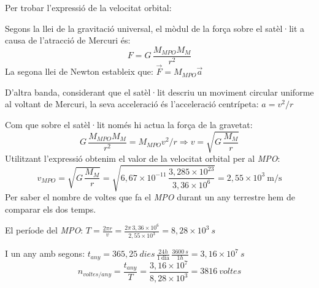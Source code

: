 \begin{solapartat}
Per trobar l'expressió de la velocitat orbital:

 Segons la llei de la gravitació universal, el mòdul de la força sobre el satèl·lit a causa de l'atracció de Mercuri és:
\[ F = G\,\frac{M_{MPO}M_M}{r^2} \]
 La segona llei de Newton estableix que: $\vec{F} = M_{MPO}\vec{a}$

 D'altra banda, considerant que el satèl·lit descriu un moviment circular uniforme al voltant de Mercuri, la seva acceleració és l'acceleració centrípeta: $a = v^2/r$

 Com que sobre el satèl·lit només hi actua la força de la gravetat:
\[ G\,\frac{M_{MPO}M_M}{r^2} = M_{MPO}v^2/r \Rightarrow v = \sqrt{G\,\frac{M_M}{r}} \]
 Utilitzant l'expressió obtenim el valor de la velocitat orbital per al \textit{MPO}:
\[ v_{MPO} = \sqrt{G\,\frac{M_M}{r}} = \sqrt{6,67\times 10^{-11}\,\frac{3,285\times 10^{23}}{3,36\times 10^{6}}} = 2,55\times 10^{3}\ \mathrm{m/s} \]
 Per saber el nombre de voltes que fa el \textit{MPO} durant un any terrestre hem de comparar els dos temps.

El període del \textit{MPO}: $T = \frac{2\pi r}{v} = \frac{2\pi\, 3,36\times 10^{6}}{2,55\times 10^{3}} = 8,28\times 10^{3}\ s$

 I un any amb segons: $t_{any} = 365,25\ dies\,\frac{24h}{1\ \mathrm{dia}}\,\frac{3600\ s}{1h} = 3,16\times 10^{7}\ s$
\[ n_{voltes/any} = \frac{t_{any}}{T} = \frac{3,16\times 10^{7}}{8,28\times 10^{3}} = 3816\ voltes \]
\end{solapartat}

